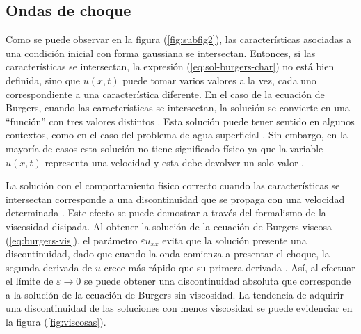 \subsection{Ondas de choque}
Como se puede observar en la figura (\ref{fig:subfig2}), las características asociadas a una condición inicial con forma gaussiana se intersectan. Entonces, si las características se intersectan, la expresión (\ref{eq:sol-burgers-char}) no está bien definida, sino que $u(x,t)$ puede tomar varios valores a la vez, cada uno correspondiente a una característica diferente. En el caso de la ecuación de Burgers, cuando las características se intersectan, la solución se convierte en una ``función'' con tres valores distintos \cite{Leveque}. Esta solución puede tener sentido en algunos contextos, como en el caso del problema de agua superficial \cite{Leveque}. Sin embargo, en la mayoría de casos esta solución no tiene significado físico ya que la variable $u(x,t)$ representa una velocidad y esta debe devolver un solo valor \cite{Leveque}.

La solución con el comportamiento físico correcto cuando las características se intersectan corresponde a una discontinuidad que se propaga con una velocidad determinada \cite{Leveque}. Este efecto se puede demostrar a través del formalismo de la viscosidad disipada. Al obtener la solución de la ecuación de Burgers viscosa (\ref{eq:burgers-vis}), el parámetro $\varepsilon u_{xx}$ evita que la solución presente una discontinuidad, dado que cuando la onda comienza a presentar el choque, la segunda derivada de $u$ crece más rápido que su primera derivada \cite{Leveque}. Así, al efectuar el límite de $\varepsilon \rightarrow 0$ se puede obtener una discontinuidad absoluta que corresponde a la solución de la ecuación de Burgers sin viscosidad. La tendencia de adquirir una discontinuidad  de las soluciones con menos viscosidad se puede evidenciar en la figura (\ref{fig:viscosas}).

